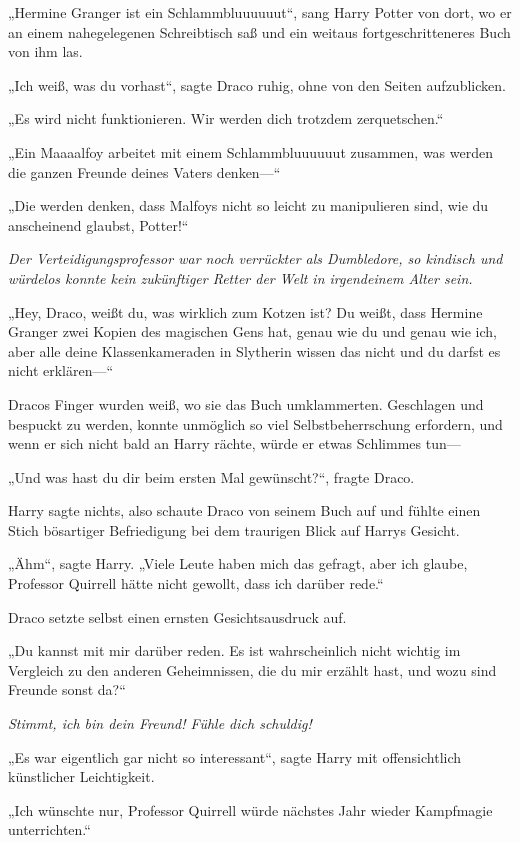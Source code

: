 {„Hermine Granger ist ein Schlammbluuuuuut“, sang Harry Potter von dort, wo er an einem nahegelegenen Schreibtisch saß und ein weitaus fortgeschritteneres Buch von ihm las.

„Ich weiß, was du vorhast“, sagte Draco ruhig, ohne von den Seiten aufzublicken.

„Es wird nicht funktionieren. Wir werden dich trotzdem zerquetschen.“

„Ein Maaaalfoy arbeitet mit einem Schlammbluuuuuut zusammen, was werden die ganzen Freunde deines Vaters denken—“

„Die werden denken, dass Malfoys nicht so leicht zu manipulieren sind, wie du anscheinend glaubst, Potter!“

\emph{Der Verteidigungsprofessor war noch verrückter als Dumbledore, so kindisch und würdelos konnte kein zukünftiger Retter der Welt in irgendeinem Alter sein.}

„Hey, Draco, weißt du, was wirklich zum Kotzen ist? Du weißt, dass Hermine Granger zwei Kopien des magischen Gens hat, genau wie du und genau wie ich, aber alle deine Klassenkameraden in Slytherin wissen das nicht und du darfst es nicht erklären—“

Dracos Finger wurden weiß, wo sie das Buch umklammerten. Geschlagen und bespuckt zu werden, konnte unmöglich so viel Selbstbeherrschung erfordern, und wenn er sich nicht bald an Harry rächte, würde er etwas Schlimmes tun—

„Und was hast du dir beim ersten Mal gewünscht?“, fragte Draco.

Harry sagte nichts, also schaute Draco von seinem Buch auf und fühlte einen Stich bösartiger Befriedigung bei dem traurigen Blick auf Harrys Gesicht.

„Ähm“, sagte Harry. „Viele Leute haben mich das gefragt, aber ich glaube, Professor Quirrell hätte nicht gewollt, dass ich darüber rede.“

Draco setzte selbst einen ernsten Gesichtsausdruck auf.

„Du kannst mit mir darüber reden. Es ist wahrscheinlich nicht wichtig im Vergleich zu den anderen Geheimnissen, die du mir erzählt hast, und wozu sind Freunde sonst da?“

\emph{Stimmt, ich bin dein Freund! Fühle dich schuldig!}

„Es war eigentlich gar nicht so interessant“, sagte Harry mit offensichtlich künstlicher Leichtigkeit.

„Ich wünschte nur, Professor Quirrell würde nächstes Jahr wieder Kampfmagie unterrichten.“

}
